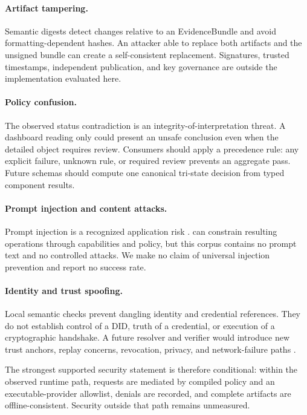 \paragraph{Artifact tampering.}
Semantic digests detect changes relative to an EvidenceBundle and avoid
formatting-dependent hashes.  An attacker able to replace both artifacts and
the unsigned bundle can create a self-consistent replacement.  Signatures,
trusted timestamps, independent publication, and key governance are outside
the implementation evaluated here.

\paragraph{Policy confusion.}
The observed status contradiction is an integrity-of-interpretation threat.
A dashboard reading only  could present an unsafe
conclusion even when the detailed object requires review.  Consumers should
apply a precedence rule: any explicit failure, unknown rule, or required review
prevents an aggregate pass.  Future schemas should compute one canonical
tri-state decision from typed component results.

\paragraph{Prompt injection and content attacks.}
Prompt injection is a recognized application risk \citep{owasp_llm_top10}.
\Argorix can constrain resulting operations through capabilities and policy,
but this corpus contains no prompt text and no controlled attacks.  We make no
claim of universal injection prevention and report no success rate.

\paragraph{Identity and trust spoofing.}
Local semantic checks prevent dangling identity and credential references.
They do not establish control of a DID, truth of a credential, or execution of
a cryptographic handshake.  A future resolver and verifier would introduce
new trust anchors, replay concerns, revocation, privacy, and network-failure
paths \citep{w3c_did_core_2022,w3c_vc_data_model_2025}.

The strongest supported security statement is therefore conditional: within
the observed runtime path, requests are mediated by compiled policy and an
executable-provider allowlist, denials are recorded, and complete artifacts are
offline-consistent.  Security outside that path remains unmeasured.
